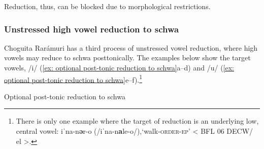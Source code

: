 Reduction, thus, can be blocked due to morphological restrictions.

\subsubsection{Unstressed high vowel reduction to schwa}
\label{subsubsec*: unstressed high vowel reduction to schwa}

Choguita Rarámuri has a third process of unstressed vowel reduction, where high vowels may reduce to schwa posttonically. The examples below show the target vowels, /i/ (\ref{ex: optional post-tonic reduction to schwa}a--d) and /u/ (\ref{ex: optional post-tonic reduction to schwa}e--f).\footnote{There is only one example where the target of reduction is an underlying low, central vowel: iˈna-n\textbf{ə}r-o (/iˈna-n\textbf{a}le-o/),‘walk-\textsc{order-ep}’ < BFL 06 DECW/ el >.}

\ea\label{ex: optional post-tonic reduction to schwa}
{Optional post-tonic reduction to schwa}

